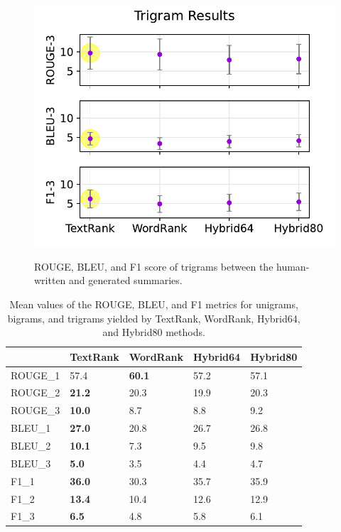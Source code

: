 \documentclass[11pt]{article}
\begin{document}
\begin{figure}[!h]
\centering
\includegraphics[scale = 0.5]{../figures/trigrams.pdf}
\label{fig:tri}
\caption{ROUGE, BLEU, and F1 score of trigrams between the human-written and generated summaries.}
\end{figure}

\begin{table}[!h]
\centering
\begin{tabular}{l|llll}
\hline
&\textbf{TextRank} & \textbf{WordRank} & \textbf{Hybrid64} & \textbf{Hybrid80} \\
\hline
ROUGE\_1 & 57.4 & \textbf{60.1} & 57.2 & 57.1\\
ROUGE\_2 & \textbf{21.2} & 20.3 & 19.9 & 20.3\\
ROUGE\_3 & \textbf{10.0} & 8.7 & 8.8 & 9.2\\
BLEU\_1 & \textbf{27.0} & 20.8 & 26.7 & 26.8\\
BLEU\_2 & \textbf{10.1} & 7.3 & 9.5 & 9.8\\
BLEU\_3 & \textbf{5.0} & 3.5 & 4.4 & 4.7\\
F1\_1 & \textbf{36.0} & 30.3 & 35.7 & 35.9\\
F1\_2 & \textbf{13.4} & 10.4 & 12.6 & 12.9\\
F1\_3  & \textbf{6.5} & 4.8 & 5.8 & 6.1\\
\hline
\end{tabular}

\caption{\label{tab:means}
Mean values of the ROUGE, BLEU, and F1 metrics for unigrams, bigrams, and trigrams yielded by TextRank, WordRank, Hybrid64, and Hybrid80 methods.
}
\end{table}
\end{document}
